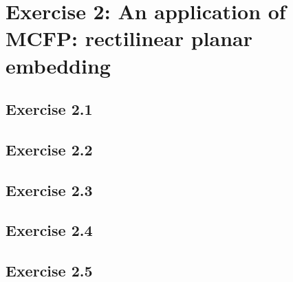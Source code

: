 \section{Exercise 2: An application of MCFP: rectilinear planar embedding}
\subsection{Exercise 2.1}
\subsection{Exercise 2.2}
\subsection{Exercise 2.3}
\subsection{Exercise 2.4}
\subsection{Exercise 2.5}